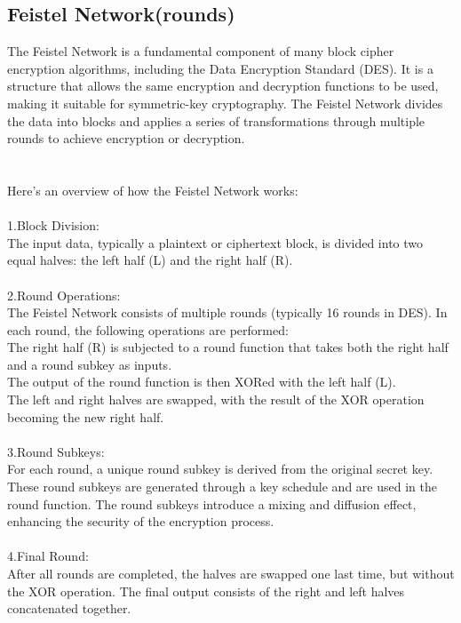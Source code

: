 \documentclass{report}
\begin{document}
\subsection{Feistel Network(rounds)}
The Feistel Network is a fundamental component of many block cipher encryption algorithms, including the Data Encryption Standard (DES). It is a structure that allows the same encryption and decryption functions to be used, making it suitable for symmetric-key cryptography. The Feistel Network divides the data into blocks and applies a series of transformations through multiple rounds to achieve encryption or decryption.\\
\\
\\
Here's an overview of how the Feistel Network works:\\
\\
1.Block Division:\\
 The input data, typically a plaintext or ciphertext block, is divided into two equal halves: the left half (L) and the right half (R).\\
\\
2.Round Operations:\\
 The Feistel Network consists of multiple rounds (typically 16 rounds in DES). In each round, the following operations are performed:\\
The right half (R) is subjected to a round function that takes both the right half and a round subkey as inputs.\\
The output of the round function is then XORed with the left half (L).\\
The left and right halves are swapped, with the result of the XOR operation becoming the new right half.\\
\\
3.Round Subkeys:\\
 For each round, a unique round subkey is derived from the original secret key. These round subkeys are generated through a key schedule and are used in the round function. The round subkeys introduce a mixing and diffusion effect, enhancing the security of the encryption process.\\
\\
4.Final Round: \\
After all rounds are completed, the halves are swapped one last time, but without the XOR operation. The final output consists of the right and left halves concatenated together.\\
\\
\end{document}
